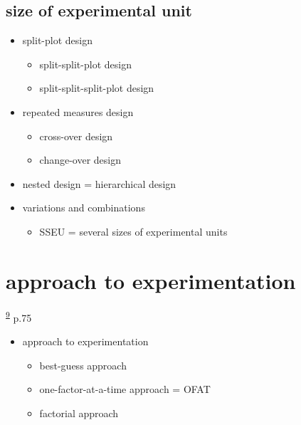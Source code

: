 \documentclass[
]{book}
\providecommand{\tightlist}{%
  \setlength{\itemsep}{0pt}\setlength{\parskip}{0pt}}
\theoremstyle{definition}
\theoremstyle{definition}
\theoremstyle{definition}
\theoremstyle{definition}
\theoremstyle{remark}
\begin{document}
\hypertarget{size-of-experimental-unit}{%
\subsection{size of experimental unit}\label{size-of-experimental-unit}}

\begin{itemize}
\tightlist
\item
  split-plot design

  \begin{itemize}
  \tightlist
  \item
    split-split-plot design
  \item
    split-split-split-plot design
  \end{itemize}
\item
  repeated measures design

  \begin{itemize}
  \tightlist
  \item
    cross-over design
  \item
    change-over design
  \end{itemize}
\item
  nested design = hierarchical design
\item
  variations and combinations

  \begin{itemize}
  \tightlist
  \item
    SSEU = several sizes of experimental units
  \end{itemize}
\end{itemize}

\hypertarget{approach-to-experimentation}{%
\section{approach to experimentation}\label{approach-to-experimentation}}

\textsuperscript{\protect\hyperlink{ref-hu2022}{9}} p.75

\begin{itemize}
\tightlist
\item
  approach to experimentation

  \begin{itemize}
  \tightlist
  \item
    best-guess approach
  \item
    one-factor-at-a-time approach = OFAT
  \item
    factorial approach
  \end{itemize}
\end{itemize}
\end{document}
